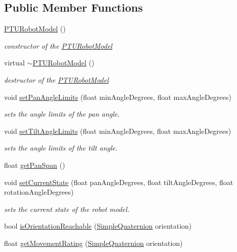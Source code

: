 \subsection*{\-Public \-Member \-Functions}
\begin{DoxyCompactItemize}
\item 
\hyperlink{classnext__best__view_1_1PTURobotModel_a1251bb29a4dca855785ec3905edf8167}{\-P\-T\-U\-Robot\-Model} ()
\begin{DoxyCompactList}\small\item\em constructor of the \hyperlink{classnext__best__view_1_1PTURobotModel}{\-P\-T\-U\-Robot\-Model} \end{DoxyCompactList}\item 
virtual \hyperlink{classnext__best__view_1_1PTURobotModel_a754fe81bb5ff58d62a242ea4b3d6e2e8}{$\sim$\-P\-T\-U\-Robot\-Model} ()
\begin{DoxyCompactList}\small\item\em destructor of the \hyperlink{classnext__best__view_1_1PTURobotModel}{\-P\-T\-U\-Robot\-Model} \end{DoxyCompactList}\item 
void \hyperlink{classnext__best__view_1_1PTURobotModel_a5e3a6b073ce0d5eb4a9e3dacc45b9847}{set\-Pan\-Angle\-Limits} (float min\-Angle\-Degrees, float max\-Angle\-Degrees)
\begin{DoxyCompactList}\small\item\em sets the angle limits of the pan angle. \end{DoxyCompactList}\item 
void \hyperlink{classnext__best__view_1_1PTURobotModel_ae12bf6ccc2a7a736210caae82a2841c2}{set\-Tilt\-Angle\-Limits} (float min\-Angle\-Degrees, float max\-Angle\-Degrees)
\begin{DoxyCompactList}\small\item\em sets the angle limits of the tilt angle. \end{DoxyCompactList}\item 
float \hyperlink{classnext__best__view_1_1PTURobotModel_a359a1666a7f2953120e20bff134bfd33}{get\-Pan\-Span} ()
\item 
void \hyperlink{classnext__best__view_1_1PTURobotModel_afe4931b13ad90f7687dfb893937c8b7c}{set\-Current\-State} (float pan\-Angle\-Degrees, float tilt\-Angle\-Degrees, float rotation\-Angle\-Degrees)
\begin{DoxyCompactList}\small\item\em sets the current state of the robot model. \end{DoxyCompactList}\item 
bool \hyperlink{classnext__best__view_1_1PTURobotModel_aa6a86fde68a03e1536f26ed2a2bec8f3}{is\-Orientation\-Reachable} (\hyperlink{namespacenext__best__view_a165f1f159539ff8e583fb7fe3620390c}{\-Simple\-Quaternion} orientation)
\item 
float \hyperlink{classnext__best__view_1_1PTURobotModel_af668fa72814fe340c58a2fc2e17d0087}{get\-Movement\-Rating} (\hyperlink{namespacenext__best__view_a165f1f159539ff8e583fb7fe3620390c}{\-Simple\-Quaternion} orientation)
\end{DoxyCompactItemize}


